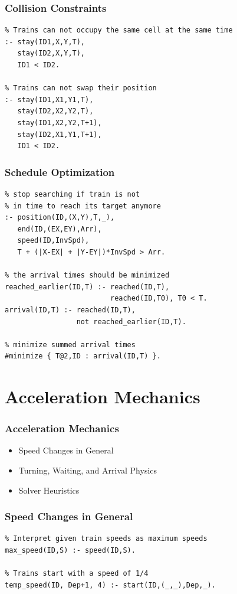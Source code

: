 \documentclass{beamer}
\begin{document}
\begin{frame}[fragile]
\frametitle{Collision Constraints}
  \begin{verbatim}
% Trains can not occupy the same cell at the same time
:- stay(ID1,X,Y,T),
   stay(ID2,X,Y,T),
   ID1 < ID2.

% Trains can not swap their position
:- stay(ID1,X1,Y1,T),
   stay(ID2,X2,Y2,T),
   stay(ID1,X2,Y2,T+1),
   stay(ID2,X1,Y1,T+1),
   ID1 < ID2.
  \end{verbatim}
\end{frame}

\begin{frame}[fragile]
\frametitle{Schedule Optimization}
\begin{verbatim}
% stop searching if train is not
% in time to reach its target anymore
:- position(ID,(X,Y),T,_),
   end(ID,(EX,EY),Arr),
   speed(ID,InvSpd),
   T + (|X-EX| + |Y-EY|)*InvSpd > Arr.
   
% the arrival times should be minimized
reached_earlier(ID,T) :- reached(ID,T),
                         reached(ID,T0), T0 < T.
arrival(ID,T) :- reached(ID,T),
                 not reached_earlier(ID,T).

% minimize summed arrival times
#minimize { T@2,ID : arrival(ID,T) }.
\end{verbatim}
\end{frame}

\section{Acceleration Mechanics}
\begin{frame}
\frametitle{Acceleration Mechanics}
\begin{itemize}
  \item Speed Changes in General
  \item Turning, Waiting, and Arrival Physics
  \item Solver Heuristics
\end{itemize}
\end{frame}

\begin{frame}[fragile]
\frametitle{Speed Changes in General}
\begin{verbatim}
% Interpret given train speeds as maximum speeds
max_speed(ID,S) :- speed(ID,S).

% Trains start with a speed of 1/4 
temp_speed(ID, Dep+1, 4) :- start(ID,(_,_),Dep,_).
\end{verbatim}
\end{frame}
\end{document}
